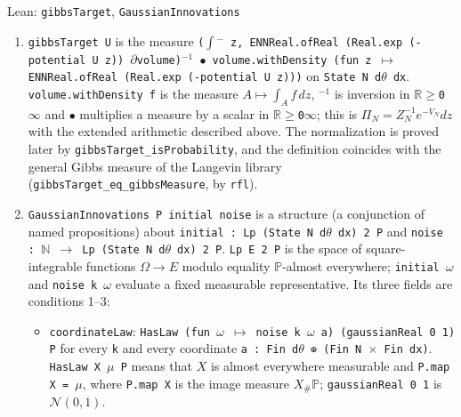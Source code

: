 \documentclass[11pt,a4paper]{article}
\begin{document}
\begin{leanbox}{Lean: \texttt{gibbsTarget}, \texttt{GaussianInnovations}}
\begin{enumerate}
\item \texttt{gibbs\allowbreak{}Target U} is the measure \texttt{(\ensuremath{\int}\ensuremath{{}^{-}} z, ENNReal.\allowbreak{}of\allowbreak{}Real (Real.\allowbreak{}exp (-\allowbreak{}potential U z)) \ensuremath{\partial}volume)\ensuremath{{}^{-1}} \ensuremath{\bullet} volume.\allowbreak{}with\allowbreak{}Density (fun z \ensuremath{\mapsto} ENNReal.\allowbreak{}of\allowbreak{}Real (Real.\allowbreak{}exp (-\allowbreak{}potential U z)))} on \texttt{State N d\ensuremath{\theta} dx}. \texttt{volume.\allowbreak{}with\allowbreak{}Density f} is the measure \(A\mapsto\int_Af\,dz\), \texttt{\ensuremath{{}^{-1}}} is inversion in \texttt{\ensuremath{\mathbb R}\ensuremath{\ge}0\ensuremath{\infty}} and \texttt{\ensuremath{\bullet}} multiplies a measure by a scalar in \texttt{\ensuremath{\mathbb R}\ensuremath{\ge}0\ensuremath{\infty}}; this is \(\Pi_N=Z_N^{-1}e^{-V_N}dz\) with the extended arithmetic described above. The normalization is proved later by \texttt{gibbs\allowbreak{}Target\_\allowbreak{}is\allowbreak{}Probability}, and the definition coincides with the general Gibbs measure of the Langevin library (\texttt{gibbs\allowbreak{}Target\_\allowbreak{}eq\_\allowbreak{}gibbs\allowbreak{}Measure}, by \texttt{rfl}).

\item \texttt{Gaussian\allowbreak{}Innovations P initial noise} is a structure (a conjunction of named propositions) about \texttt{initial : Lp (State N d\ensuremath{\theta} dx) 2 P} and \texttt{noise : \ensuremath{\mathbb N} \ensuremath{\to} Lp (State N d\ensuremath{\theta} dx) 2 P}. \texttt{Lp E 2 P} is the space of square-integrable functions \(\Omega\to E\) modulo equality \(\mathbb P\)-almost everywhere; \texttt{initial \ensuremath{\omega}} and \texttt{noise k \ensuremath{\omega}} evaluate a fixed measurable representative. Its three fields are conditions 1–3:

\begin{itemize}


\item \texttt{coordinate\allowbreak{}Law}: \texttt{Has\allowbreak{}Law (fun \ensuremath{\omega} \ensuremath{\mapsto} noise k \ensuremath{\omega} a) (gaussian\allowbreak{}Real 0 1) P} for every \texttt{k} and every coordinate \texttt{a : Fin d\ensuremath{\theta} ⊕ (Fin N \ensuremath{\times} Fin dx)}. \texttt{Has\allowbreak{}Law X \ensuremath{\mu} P} means that \(X\) is almost everywhere measurable and \texttt{P.\allowbreak{}map X = \ensuremath{\mu}}, where \texttt{P.\allowbreak{}map X} is the image measure \(X_\#\mathbb P\); \texttt{gaussian\allowbreak{}Real 0 1} is \(\mathcal N(0,1)\).


\end{itemize}
\end{enumerate}
\end{leanbox}
\end{document}
